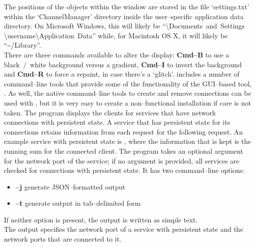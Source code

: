 The positions of the objects within the window are stored in the file `settings.txt'
within the `ChannelManager' directory inside the user--specific application data
directory.
On Microsoft Windows, this will likely be ``\textbackslash{}Documents~and~Settings%
\textbackslash{}username\textbackslash{}Application~Data'' while, for Macintosh OS X, it
will likely be ``\textasciitilde/Library''.\\

There are three commands available to alter the display: \textbf{Cmd--B} to use a
black~/~white background versus a gradient, \textbf{Cmd--I} to invert the background and
\textbf{Cmd--R} to force a repaint, in case there's a `glitch'.
\secondaryEnd{}
\newpage
{}
\mplusm{} includes a number of command--line tools that provide some of the functionality
of the GUI--based tool, .
As well, the native \yarp{} command--line tools to create and remove connections can be
used with \mplusm{}, but it is very easy to create a non--functional installation if care
is not taken.
The program  displays the clients for services that have
\yarp{} network connections with persistent state.
A service that has persistent state for its connections retains information from each
request for the following request.
An example service with persistent state is
, where the information that is kept is the
running sum for the connected client.
The program takes an optional argument for the \yarp{} network port of the service; if no
argument is provided, all services are checked for connections with persistent state.
It has two command--line options:
\begin{itemize}
\item \textbf{--j} generate JSON--formatted output
\item \textbf{--t} generate output in tab--delimited form
\end{itemize}
If neither option is present, the output is written as simple text.\\

The output specifies the \yarp{} network port of a service with persistent state and the
\yarp{} network ports that are connected to it.\\

